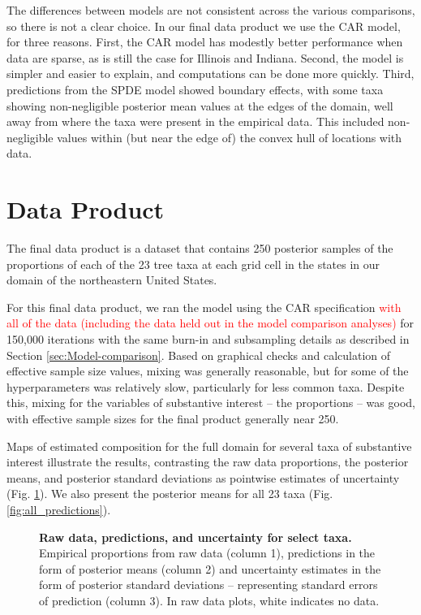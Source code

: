 \documentclass[10pt,letterpaper]{article}
\begin{document}
The differences between models are not consistent across the various
comparisons, so there is not a clear choice. In our final data product
we use the CAR model, for three reasons. First, the CAR model has
modestly better performance when data are sparse, as is still the
case for Illinois and Indiana. Second, the model is simpler and easier
to explain, and computations can be done more quickly. Third, predictions
from the SPDE model showed boundary effects, with some taxa showing
non-negligible posterior mean values at the edges of the domain, well
away from where the taxa were present in the empirical data. This
included non-negligible values within (but near the edge of) the convex
hull of locations with data. 





\section*{Data Product\label{sec:Data-product}}

The final data product is a dataset that contains 250 posterior samples
of the proportions of each of the 23 tree taxa at each grid cell in
the states in our domain of the northeastern United States.

For this final data product, we ran the model using the CAR specification
\textcolor{red}{with all of the data (including the data held out
in the model comparison analyses)} for 150,000 iterations with the
same burn-in and subsampling details as described in Section \ref{sec:Model-comparison}.
Based on graphical checks and calculation of effective sample size
values, mixing was generally reasonable, but for some of the hyperparameters
was relatively slow, particularly for less common taxa. Despite this,
mixing for the variables of substantive interest -- the proportions
-- was good, with effective sample sizes for the final product generally
near 250.

Maps of estimated composition for the full domain for several taxa
of substantive interest illustrate the results, contrasting the raw
data proportions, the posterior means, and posterior standard deviations
as pointwise estimates of uncertainty (Fig. \ref{fig:select_maps}).
We also present the posterior means for all 23 taxa (Fig. \ref{fig:all_predictions}).


\begin{figure}


\caption{{\bf Raw data, predictions, and uncertainty for select taxa.} 
\\Empirical proportions from raw data (column 1), predictions in the
form of posterior means (column 2) and uncertainty estimates in the
form of posterior standard deviations -- representing standard errors
of prediction (column 3). In raw data plots, white indicates no data.}
\label{fig:select_maps}
\end{figure}
\end{document}
